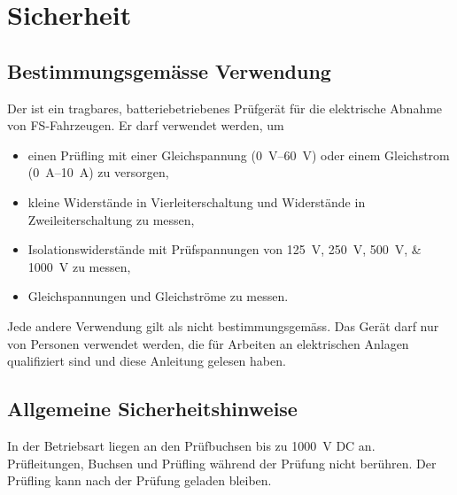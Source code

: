 \section{Sicherheit}
\label{sec:safety}

\subsection{Bestimmungsgemässe Verwendung}
Der \ST{} ist ein tragbares, batteriebetriebenes Prüfgerät für die elektrische Abnahme von
\ac{FS}-Fahrzeugen. Er darf verwendet werden, um
\begin{itemize}
    \item einen Prüfling mit einer Gleichspannung (\qtyrange{0}{60}{\volt}) oder einem Gleichstrom (\qtyrange{0}{10}{\ampere}) zu versorgen,
    \item kleine Widerstände in Vierleiterschaltung und Widerstände in Zweileiterschaltung zu messen,
    \item Isolationswiderstände mit Prüfspannungen von \qtylist{125;250;500;1000}{\volt} zu messen,
    \item Gleichspannungen und Gleichströme zu messen.
\end{itemize}
Jede andere Verwendung gilt als nicht bestimmungsgemäss. Das Gerät darf nur von Personen
verwendet werden, die für Arbeiten an elektrischen Anlagen qualifiziert sind und diese
Anleitung gelesen haben.

\subsection{Allgemeine Sicherheitshinweise}

\begin{danger}
    In der Betriebsart  liegen an den Prüfbuchsen bis zu \qty{1000}{\volt} DC an.
    Prüfleitungen, Buchsen und Prüfling während der Prüfung nicht berühren.
    Der Prüfling kann nach der Prüfung geladen bleiben.
\end{danger}

